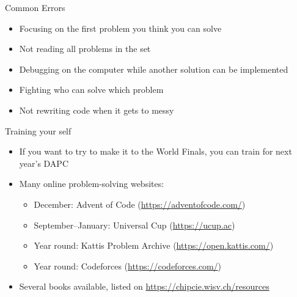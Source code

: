 \documentclass[11pt,pdf, aspectratio=169]{beamer}
\begin{document}
  \begin{frame}{Common Errors}
    \begin{itemize}
      \item Focusing on the first problem you think you can solve
      \item Not reading all problems in the set
      \item Debugging on the computer while another solution can be implemented
      \item Fighting who can solve which problem
      \item Not rewriting code when it gets to messy
    \end{itemize}
  \end{frame}

  \begin{frame}{Training your self}
    \begin{itemize}
      \item If you want to try to make it to the World Finals, you can train for next year's DAPC
      \item Many online problem-solving websites:
      \begin{itemize}
        \item December: Advent of Code (\url{https://adventofcode.com/})
        \item September--January: Universal Cup (\url{https://ucup.ac})
        \item Year round: Kattis Problem Archive (\url{https://open.kattis.com/})
        \item Year round: Codeforces (\url{https://codeforces.com/})
      \end{itemize}
      \item Several books available, listed on \url{https://chipcie.wisv.ch/resources}
    \end{itemize}
  \end{frame}
\end{document}
